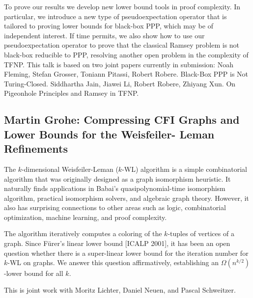 \documentclass[11pt]{article}
\begin{document}
To prove our results we develop new lower bound tools in proof complexity. In particular, we introduce a new type of pseudoexpectation operator that is tailored to proving lower bounds for black-box PPP, which may be of independent interest. If time permits, we also show how to use our pseudoexpectation operator to prove that the classical Ramsey problem is not black-box reducible to PPP, resolving another open problem in the complexity of TFNP. This talk is based on two joint papers currently in submission: Noah Fleming, Stefan Grosser, Toniann Pitassi, Robert Robere. Black-Box PPP is Not Turing-Closed. Siddhartha Jain, Jiawei Li, Robert Robere, Zhiyang Xun. On Pigeonhole Principles and Ramsey in TFNP.

\subsection*{Martin Grohe: Compressing CFI Graphs and Lower Bounds for the Weisfeiler-
Leman Refinements}\label{Grohe}

The $k$-dimensional Weisfeiler-Leman ($k$-WL) algorithm is a simple combinatorial algorithm that was originally designed as a graph isomorphism heuristic. It naturally finds applications in Babai's quasipolynomial-time isomorphism algorithm, practical isomorphism solvers, and algebraic graph theory. However, it also has surprising connections to other areas such as logic, combinatorial optimization, machine learning, and proof complexity.

The algorithm iteratively computes a coloring of the $k$-tuples of vertices of a graph. Since F\"{u}rer's linear lower bound [ICALP 2001], it has been an open question whether there is a super-linear lower bound for the iteration number for $k$-WL on graphs. We answer this question affirmatively, establishing an $\Omega(n^{k/2})$-lower bound for all $k$.

This is joint work with Moritz Lichter, Daniel Neuen, and Pascal Schweitzer.
\end{document}
